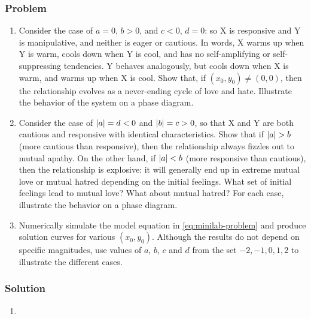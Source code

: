 \documentclass[12pt]{article}
\begin{document}
\subsubsection*{Problem}
\begin{enumerate}
\item Consider the case of $a = 0$, $b > 0$, and $c < 0$, $d = 0$: so X is
  responsive and Y is manipulative, and neither is eager or cautious. In words,
  X warms up when Y is warm, cools down when Y is cool, and has no
  self-amplifying or self-suppressing tendencies. Y behaves analogously, but
  cools down when X is warm, and warms up when X is cool. Show that, if
  $(x_0,y_0)\ne(0,0)$, then the relationship evolves as a never-ending cycle of
  love and hate. Illustrate the behavior of the system on a phase diagram.
\item Consider the case of $\left|{a}\right| = d < 0$ and $\left|{b}\right| = c > 0$, so that X
  and Y are both cautious and responsive with identical characteristics. Show
  that if $\left|{a}\right| > b$ (more cautious than responsive), then the relationship
  always fizzles out to mutual apathy. On the other hand, if $\left|{a}\right| < b$ (more
  responsive than cautious), then the relationship is explosive: it will
  generally end up in extreme mutual love or mutual hatred depending on the
  initial feelings. What set of initial feelings lead to mutual love? What about
  mutual hatred? For each case, illustrate the behavior on a phase diagram.
\item Numerically simulate the model equation in \cref{eq:minilab-problem} and
  produce solution curves for various $(x_0,y_0)$. Although the results do not
  depend on specific magnitudes, use values of $a$, $b$, $c$ and $d$ from the
  set ${−2, −1, 0, 1, 2}$ to illustrate the different cases.
\end{enumerate}

\subsubsection*{Solution}
\begin{enumerate}
\item
\end{enumerate}
\end{document}
